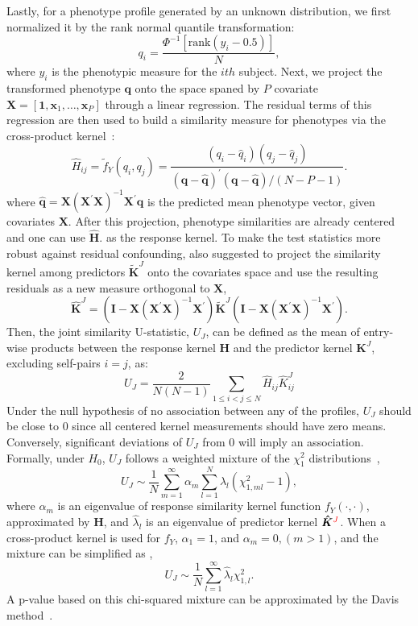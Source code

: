 \documentclass[11pt]{article}
\newcommand{\bs}{\boldsymbol}
\begin{document}
Lastly, for a phenotype profile generated by an unknown distribution, we first normalized it by the rank normal quantile transformation:
\[ q_i = \frac{\Phi^{-1}[\text{rank}(y_i - 0.5)]}{N}, \]
where $y_i$ is the phenotypic measure for the $ith$ subject. Next, we project the transformed phenotype $\bs{q}$ onto the space spaned by $P$ covariate $\bs{X}=[\bs{1}, \bs{x}_1, \dots, \bs{x}_P]$ through a linear regression. The residual terms of this regression are then used to build a similarity measure for phenotypes via the cross-product kernel~\citep{UST1}:
\[ \hat{H}_{ij} = \tilde{f}_Y(q_i, q_j) = \frac{(q_i - \hat{q}_i)(q_j - \hat{q}_j)}{(\bs{q}-\bs{\hat{q}})^\prime(\bs{q}-\bs{\hat{q}})/(N-P-1)}. \]
where $\hat{\bs{q}} = \bs{X}(\bs{X}^\prime\bs{X})^{-1}\bs{X}^\prime \bs{q}$ is the predicted mean phenotype vector, given covariates $\bs{X}$. After this projection, phenotype similarities are already centered and one can use $\hat{\bs{H}}$. as the response kernel. To make the test statistics more robust against residual confounding, \cite{HWU1} also suggested to project the similarity kernel among predictors ${\bs\tilde{K}}^J$ onto the covariates space and use the resulting residuals as a new measure orthogonal to $\bs{X}$,
\[ \bs{\hat{K}}^J = (\bs{I} - \bs{X}(\bs{X}^\prime\bs{X})^{-1}\bs{X}^\prime) \bs{\tilde{K}}^J (\bs{I} - \bs{X}(\bs{X}^\prime\bs{X})^{-1}\bs{X}^\prime). \]
Then, the joint similarity U-statistic, $U_J$, can be defined as the mean of entry-wise products between the response kernel $\bs{H}$ and the predictor kernel $\bs{K}^J$, excluding self-pairs $i=j$, as:
\[ U_J = \frac{2}{N(N-1)} \sum_{1 \leq i < j \leq N}^{} \hat{H}_{ij} \hat{K}_{ij}^J \]
Under the null hypothesis of no association between any of the profiles, $U_J$ should be close to $0$ since all centered kernel measurements should have zero means. Conversely, significant deviations of $U_J$ from $0$ will imply an association. Formally, under $H_0$,  $U_J$ follows a weighted mixture of the $\chi_1^2$ distributions~\citep{UST1},
\[ U_J \sim \frac{1}{N} \sum_{m=1}^\infty{\alpha_m \sum_{l=1}^N{\hat{\lambda}_l (\chi^2_{1,ml} - 1)} }, \]
where $\alpha_m$ is an eigenvalue of response similarity kernel function $f_Y(\cdot, \cdot)$, approximated by $\bs{H}$, and $\hat{\lambda}_l$ is an eigenvalue of predictor kernel $\bs{\hat{K}}\textcolor{red}{^J}$. When a cross-product kernel is used for $f_Y$, $\alpha_1 = 1$, and $\alpha_m = 0, (m > 1)$, and the mixture can be simplified as \citep{UST1},
\[ U_J \sim \frac{1}{N} \sum_{l=1}^\infty{\hat{\lambda}_l \chi^2_{1,l}}. \]
A p-value based on this chi-squared mixture can be approximated by the Davis method~\citep{davies80}.
\end{document}
